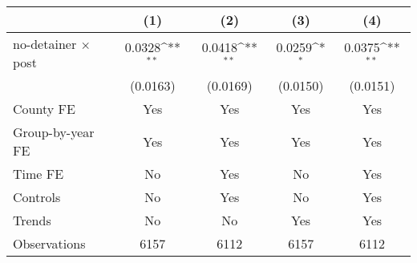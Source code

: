 {
\def\sym#1{\ifmmode^{#1}\else\(^{#1}\)\fi}
\begin{tabular}{l*{4}{c}}
\hline\hline
                    &\multicolumn{1}{c}{(1)}         &\multicolumn{1}{c}{(2)}         &\multicolumn{1}{c}{(3)}         &\multicolumn{1}{c}{(4)}         \\
\hline
no-detainer $\times$ post&      0.0328\sym{**} &      0.0418\sym{**} &      0.0259\sym{*}  &      0.0375\sym{**} \\
                    &    (0.0163)         &    (0.0169)         &    (0.0150)         &    (0.0151)         \\
[1em]
County FE           &         Yes         &         Yes         &         Yes         &         Yes         \\
[1em]
Group-by-year FE    &         Yes         &         Yes         &         Yes         &         Yes         \\
[1em]
Time FE             &          No         &         Yes         &          No         &         Yes         \\
[1em]
Controls            &          No         &         Yes         &          No         &         Yes         \\
[1em]
Trends              &          No         &          No         &         Yes         &         Yes         \\
\hline
Observations        &        6157         &        6112         &        6157         &        6112         \\
\hline\hline
\end{tabular}
}
